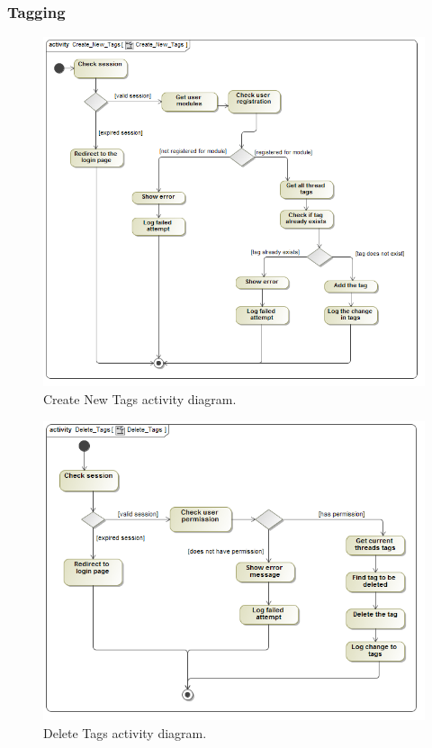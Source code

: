 \documentclass [a4paper,12pt] {article}
\begin{document}
		\subsubsection{Tagging}
			\begin{figure}[H]
				\centering
				\includegraphics[width=1.0\textwidth]{CreateNewTagsAD.png}
				\caption{Create New Tags activity diagram.}
			\end{figure}
			\begin{figure}[H]
				\centering
				\includegraphics[width=1.0\textwidth]{DeleteTagsAD.png}
				\caption{Delete Tags activity diagram.}
			\end{figure}
\end{document}
